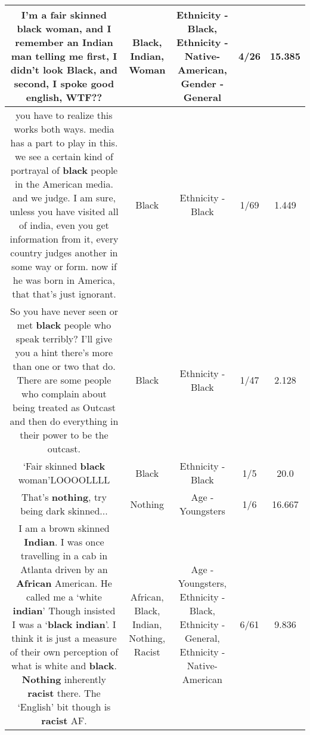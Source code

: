 \documentclass[11pt]{article}
\newlength\mylength
\begin{document}
\begin{center}
\begin{longtable}{|C{.65\mylength}|C{.30\mylength}|C{.12\mylength}|C{.12\mylength}|C{.12\mylength}|}
  \small I'm a fair skinned \textbf{black} \textbf{woman}, and I remember an \textbf{Indian} man telling me first, I didn't look \textbf{Black}, and second, I spoke good english, WTF??\normalsize   & Black, Indian, Woman & Ethnicity - Black, Ethnicity - Native-American, Gender - General & 4/26 & 15.385 \\  \hline
  \small you have to realize this works both ways. media has a part to play in this. we see a certain kind of portrayal of \textbf{black} people in the American media. and we judge. I am sure, unless you have visited all of india, even you get information from it,  every country judges another in some way or form. now if he was born in America, that that's just ignorant.\normalsize   & Black & Ethnicity - Black & 1/69 & 1.449 \\  \hline
  \small So you have never seen or met \textbf{black} people who speak terribly?  I'll give you a hint there's more than one or two that do. There are some people who complain about being treated as Outcast and then do everything in their power to be the outcast.\normalsize   & Black & Ethnicity - Black & 1/47 & 2.128 \\  \hline
  \small ‘Fair skinned \textbf{black} woman'LOOOOLLLL\normalsize   & Black & Ethnicity - Black & 1/5 & 20.0 \\  \hline
  \small That's \textbf{nothing}, try being dark skinned...\normalsize   & Nothing & Age - Youngsters & 1/6 & 16.667 \\  \hline
  \small I am a brown skinned \textbf{Indian}. I was once travelling in a cab in Atlanta driven by an \textbf{African} American. He called me a ‘white \textbf{indian}' Though insisted I was a ‘\textbf{black} \textbf{indian}'. I think it is just a measure of their own perception of what is white and \textbf{black}. \textbf{Nothing} inherently \textbf{racist} there. The ‘English' bit though is \textbf{racist} AF.\normalsize   & African, Black, Indian, Nothing, Racist & Age - Youngsters, Ethnicity - Black, Ethnicity - General, Ethnicity - Native-American & 6/61 & 9.836 \\  \hline

\end{longtable}
\end{center}
\end{document}
